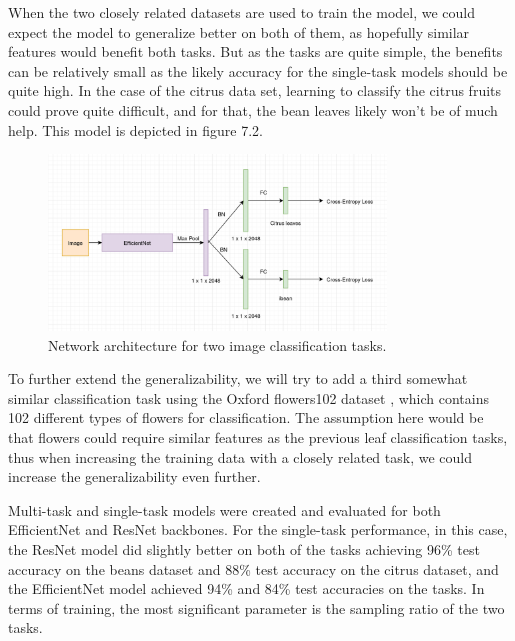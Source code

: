 When the two closely related datasets are used to train the model, we could expect the model to generalize better on both of them, as hopefully similar features would benefit both tasks.
But as the tasks are quite simple, the benefits can be relatively small as the likely accuracy for the single-task models should be quite high.
In the case of the citrus data set, learning to classify the citrus fruits could prove quite difficult, and for that, the bean leaves likely won't be of much help.
This model is depicted in figure 7.2.

\begin{figure}[h!] 
\centering 
\includegraphics[width=0.8\textwidth]{imgs/object_classification_architecture.png}
\caption{Network architecture for two image classification tasks.}
\end{figure}

To further extend the generalizability, we will try to add a third somewhat similar classification task using the Oxford flowers102 dataset \citep{flowers102}, which contains 102 different types of flowers for classification. 
The assumption here would be that flowers could require similar features as the previous leaf classification tasks, thus when increasing the training data with a closely related task, we could increase the generalizability even further.

Multi-task and single-task models were created and evaluated for both EfficientNet and ResNet backbones.
For the single-task performance, in this case, the ResNet model did slightly better on both of the tasks achieving 96\% test accuracy on the beans dataset and 88\% test accuracy on the citrus dataset, and the EfficientNet model achieved 94\% and 84\% test accuracies on the tasks.
In terms of training, the most significant parameter is the sampling ratio of the two tasks.

